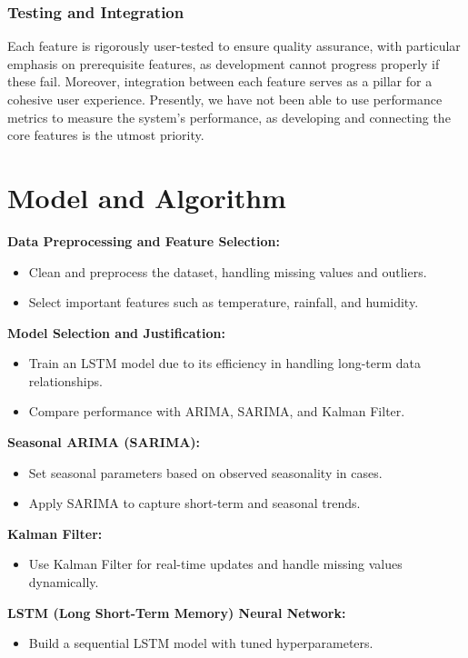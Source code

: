 \subsubsection{Testing and Integration}
Each feature is rigorously user-tested to ensure quality assurance, with particular emphasis on prerequisite features, as development cannot progress properly if these fail. Moreover, integration between each feature serves as a pillar for a cohesive user experience. Presently, we have not been able to use performance metrics to measure the system's performance, as developing and connecting the core features is the utmost priority. 

\section{Model and Algorithm}
\textbf{Data Preprocessing and Feature Selection:}
\begin{itemize}
	\item Clean and preprocess the dataset, handling missing values and outliers.
	\item Select important features such as temperature, rainfall, and humidity.
\end{itemize}

\textbf{Model Selection and Justification:}
\begin{itemize}
	\item Train an LSTM model due to its efficiency in handling long-term data relationships.
	\item Compare performance with ARIMA, SARIMA, and Kalman Filter.
\end{itemize}

\textbf{Seasonal ARIMA (SARIMA):}
\begin{itemize}
	\item Set seasonal parameters based on observed seasonality in cases.
	\item Apply SARIMA to capture short-term and seasonal trends.
\end{itemize}

\textbf{Kalman Filter:}
\begin{itemize}
	\item Use Kalman Filter for real-time updates and handle missing values dynamically.
\end{itemize}

\textbf{LSTM (Long Short-Term Memory) Neural Network:}
\begin{itemize}
	\item Build a sequential LSTM model with tuned hyperparameters.
\end{itemize}


